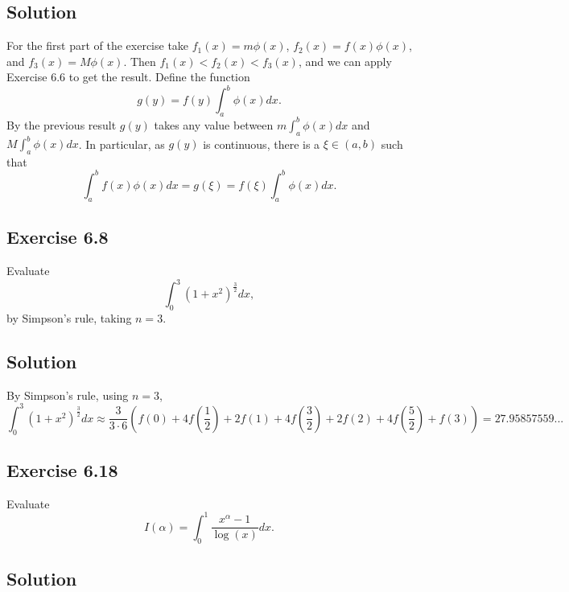 \subsection*{Solution}

For the first part of the exercise take $f_1(x) = m \phi(x)$, $f_2(x) = f(x) \phi(x)$, and $f_3(x) = M \phi(x)$.
Then $f_1(x) < f_2(x) < f_3(x)$, and we can apply Exercise 6.6 to get the result.
Define the function
\begin{equation*}
    g(y) = f(y) \int_a^b \phi(x) dx.
\end{equation*}
By the previous result $g(y)$ takes any value between $m \int_a^b \phi(x) dx$ and $M \int_a^b \phi(x) dx$.
In particular, as $g(y)$ is continuous, there is a $\xi \in (a, b)$ such that
\begin{equation*}
    \int_a^b f(x) \phi(x) dx = g(\xi) = f(\xi) \int_a^b \phi(x) dx.
\end{equation*}


\subsection*{Exercise 6.8}

Evaluate
\begin{equation*}
    \int_0^3 (1 + x^2)^{\frac{3}{2}} dx,
\end{equation*}
by Simpson's rule, taking $n = 3$.

\subsection*{Solution}
By Simpson's rule, using $n = 3$,
\begin{equation*}
    \int_0^3 (1 + x^2)^{\frac{3}{2}} dx
        \approx \frac{3}{3 \cdot 6} \left(f(0) + 4f\left(\frac{1}{2}\right) + 2f(1) + 4f\left(\frac{3}{2}\right) + 2f(2) + 4f\left(\frac{5}{2}\right) + f(3)\right)
        = 27.95857559...
\end{equation*}


\subsection*{Exercise 6.18}

Evaluate
\begin{equation*}
    I(\alpha) = \int_0^1 \frac{x^{\alpha} - 1}{\log(x)} dx.
\end{equation*}

\subsection*{Solution}

